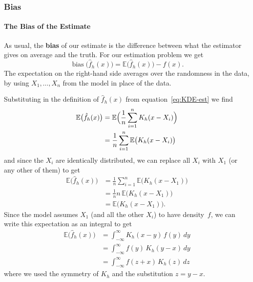 \documentclass[
  a4paper,
]{article}
\theoremstyle{definition}
\theoremstyle{definition}
\theoremstyle{definition}
\theoremstyle{definition}
\theoremstyle{remark}
\begin{document}
\subsubsection{Bias}\label{X02-error-bias}

\paragraph{The Bias of the Estimate}\label{the-bias-of-the-estimate}

As usual, the \textbf{bias} of our estimate is the difference between
what the estimator gives on average and the truth. For our estimation
problem we get
\begin{equation*}
    \mathop{\mathrm{bias}}\bigl(\hat f_h(x)\bigr)
    = \mathbb{E}\bigl(\hat f_h(x)\bigr) - f(x).
\end{equation*}
The expectation on the right-hand side averages over the randomness
in the data, by using \(X_1, \ldots, X_n\) from the model in place of
the data.

Substituting in the definition of \(\hat f_h(x)\) from equation~\eqref{eq:KDE-est}
we find
\begin{align*}
    \mathbb{E}\bigl(\hat f_h(x)\bigr)
    &= \mathbb{E}\Bigl( \frac{1}{n} \sum_{i=1}^n K_h(x - X_i) \Bigr) \\
    &= \frac{1}{n} \sum_{i=1}^n \mathbb{E}\bigl( K_h(x - X_i) \bigr)
\end{align*}
and since the \(X_i\) are identically distributed, we can replace
all \(X_i\) with \(X_1\) (or any other of them) to get
\begin{align*}
    \mathbb{E}\bigl(\hat f_h(x)\bigr)
    &= \frac{1}{n} \sum_{i=1}^n \mathbb{E}\bigl( K_h(x - X_1) \bigr) \\
    &= \frac{1}{n} n \, \mathbb{E}\bigl( K_h(x - X_1) \bigr) \\
    &= \mathbb{E}\bigl( K_h(x - X_1) \bigr).
\end{align*}
Since the model assumes \(X_1\) (and all the other \(X_i\)) to have density~\(f\),
we can write this expectation as an integral to get
\begin{align*}
    \mathbb{E}\bigl(\hat f_h(x)\bigr)
    &= \int_{-\infty}^\infty K_h(x - y) \, f(y) \, dy \\
    &= \int_{-\infty}^\infty f(y) \, K_h(y - x) \, dy \\
    &= \int_{-\infty}^\infty f(z+x) \, K_h(z) \, dz
\end{align*}
where we used the symmetry of \(K_h\) and the substitution \(z = y - x\).
\end{document}
